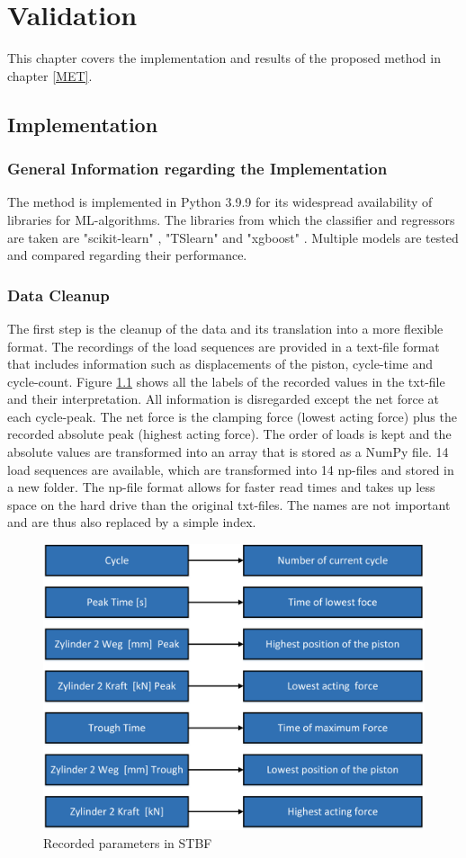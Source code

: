 \chapter{Validation}\label{Validation}
This chapter covers the implementation and results of the proposed method in chapter \ref{MET}.

\section{Implementation}
\subsection{General Information regarding the Implementation}
The method is implemented in Python 3.9.9 for its widespread availability of libraries for ML-algorithms.
The libraries from which the classifier and regressors are taken are "scikit-learn" \cite{SKlearn}, "TSlearn" \cite{tslearn} and "xgboost" \cite{XG}.
Multiple models are tested and compared regarding their performance. %
\subsection{Data Cleanup}
The first step is the cleanup of the data and its translation into a more flexible format. The recordings of the load sequences are provided in a text-file format that includes information such as displacements of the piston, cycle-time and cycle-count.
Figure \ref{fig:recordinglabel} shows all the labels of the recorded values in the txt-file and their interpretation. All information is disregarded except the net force at each cycle-peak. The net force is the clamping force (lowest acting force) plus the recorded absolute peak (highest acting force). The order of loads is kept and the absolute values are transformed into an array that is stored as a NumPy file. 14 load sequences are available, which are transformed into 14 np-files and stored in a new folder. The np-file format allows for faster read times and takes up less space on the hard drive than the original txt-files. The names are not important and are thus also replaced by a simple index.


\begin{figure}[H]
	\centering
	\includegraphics[width=0.75\linewidth]{IMGs/recordinglabel.png}
	\caption{Recorded parameters in STBF}
	\label{fig:recordinglabel}
\end{figure}

